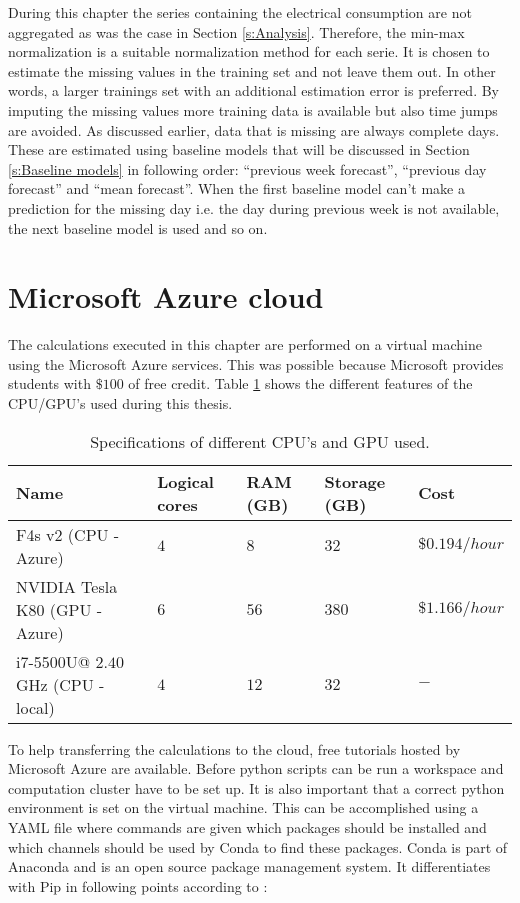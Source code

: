 During this chapter the series containing the electrical consumption are not aggregated as was the case in Section \ref{s:Analysis}. Therefore, the min-max normalization is a suitable normalization method for each serie. It is chosen to estimate the missing values in the training set and not leave them out. In other words, a larger trainings set with an additional estimation error is preferred. By imputing the missing values more training data is available but also time jumps are avoided. As discussed earlier, data that is missing are always complete days. These are estimated using baseline models that will be discussed in Section \ref{s:Baseline models} in following order: ``previous week forecast'', ``previous day forecast'' and ``mean forecast''. When the first baseline model can't make a prediction for the missing day i.e. the day during previous week is not available, the next baseline model is used and so on.\\


\section{Microsoft Azure cloud}
The calculations executed in this chapter are performed on a virtual machine using the Microsoft Azure services. This was possible because Microsoft provides students with $ \$ 100 $ of free credit. Table \ref{tab:CPU} shows the different features of the CPU/GPU's used during this thesis. 

\begin{table}[hb]
	\centering
	\begin{tabular}{|p{5cm}||p{2cm}|p{2cm}|p{2cm}|p{2cm}|}\hline
		\textbf{Name}	& \textbf{Logical cores} & \textbf{RAM (GB)} & \textbf{Storage (GB)} & \textbf{Cost}\\\hline
		F4s v2 (CPU - Azure)& $ 4 $&$ 8 $  & $ 32 $ & $ \$ 0.194/hour $\\\hline
		NVIDIA Tesla K80 (GPU - Azure)& $ 6 $&$ 56 $  & $ 380 $ & $\$ 1.166/hour$\\\hline
		i7-5500U@ $ 2.40 $ GHz (CPU - local) & $ 4 $ & $ 12 $ & $ 32 $ & $ - $\\\hline
	\end{tabular}
	\caption{Specifications of different CPU's and GPU used.}
	\label{tab:CPU}
\end{table}

To help transferring the calculations to the cloud, free tutorials hosted by Microsoft Azure are available. Before python scripts can be run a workspace and computation cluster have to be set up. It is also important that a correct python environment is set on the virtual machine. This can be accomplished using a YAML file where commands are given which packages should be installed and which channels should be used by Conda to find these packages. Conda is part of Anaconda and is an open source package management system. It differentiates with Pip in following points according to \cite{Helmus}:

